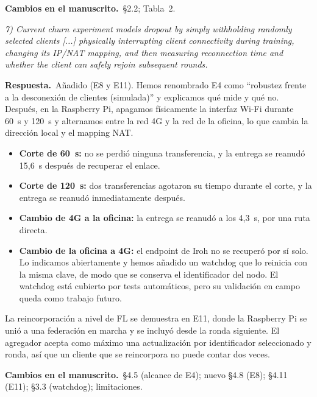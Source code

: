 \documentclass[11pt,a4paper]{article}
\newenvironment{comment}{\par\medskip\noindent\begin{minipage}{\linewidth}\color{blue!45!black}\itshape}{\end{minipage}\par}
\newcommand{\reply}{\par\smallskip\noindent\textbf{Respuesta.}~}
\newcommand{\changes}{\par\smallskip\noindent\textbf{Cambios en el manuscrito.}~}
\begin{document}
\changes \S2.2; Tabla~2.

\begin{comment}
7) Current churn experiment models dropout by simply withholding randomly selected clients [...] physically interrupting client connectivity during training, changing its IP/NAT mapping, and then measuring reconnection time and whether the client can safely rejoin subsequent rounds.
\end{comment}
\reply Añadido (E8 y E11). Hemos renombrado E4 como ``robustez frente a la desconexión de clientes (simulada)'' y explicamos qué mide y qué no. Después, en la Raspberry Pi, apagamos físicamente la interfaz Wi-Fi durante 60~s y 120~s y alternamos entre la red 4G y la red de la oficina, lo que cambia la dirección local y el mapping NAT.
\begin{itemize}[leftmargin=1.3em,itemsep=0.1em]
\item \textbf{Corte de 60~s:} no se perdió ninguna transferencia, y la entrega se reanudó 15,6~s después de recuperar el enlace.
\item \textbf{Corte de 120~s:} dos transferencias agotaron su tiempo durante el corte, y la entrega se reanudó inmediatamente después.
\item \textbf{Cambio de 4G a la oficina:} la entrega se reanudó a los 4,3~s, por una ruta directa.
\item \textbf{Cambio de la oficina a 4G:} el endpoint de Iroh no se recuperó por sí solo. Lo indicamos abiertamente y hemos añadido un watchdog que lo reinicia con la misma clave, de modo que se conserva el identificador del nodo. El watchdog está cubierto por tests automáticos, pero su validación en campo queda como trabajo futuro.
\end{itemize}
La reincorporación a nivel de FL se demuestra en E11, donde la Raspberry Pi se unió a una federación en marcha y se incluyó desde la ronda siguiente. El agregador acepta como máximo una actualización por identificador seleccionado y ronda, así que un cliente que se reincorpora no puede contar dos veces.

\changes \S4.5 (alcance de E4); nuevo \S4.8 (E8); \S4.11 (E11); \S3.3 (watchdog); limitaciones.
\end{document}
